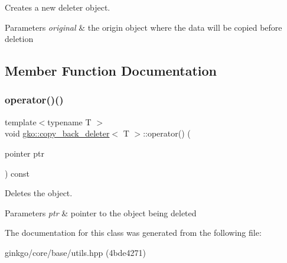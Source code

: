 Creates a new deleter object. 


\begin{DoxyParams}{Parameters}
{\em original} & the origin object where the data will be copied before deletion \\
\hline
\end{DoxyParams}


\subsection{Member Function Documentation}
\mbox{\label{classgko_1_1copy__back__deleter_a34bba76c78c23dccd814969e98c78b1b}} 
\subsubsection{\texorpdfstring{operator()()}{operator()()}}
{\footnotesize\ttfamily template$<$typename T $>$ \\
void \hyperlink{classgko_1_1copy__back__deleter}{gko\+::copy\+\_\+back\+\_\+deleter}$<$ T $>$\+::operator() (\begin{DoxyParamCaption}\item[{pointer}]{ptr }\end{DoxyParamCaption}) const}



Deletes the object. 


\begin{DoxyParams}{Parameters}
{\em ptr} & pointer to the object being deleted \\
\hline
\end{DoxyParams}


The documentation for this class was generated from the following file\+:\begin{DoxyCompactItemize}
\item 
ginkgo/core/base/utils.\+hpp (4bde4271)\end{DoxyCompactItemize}
